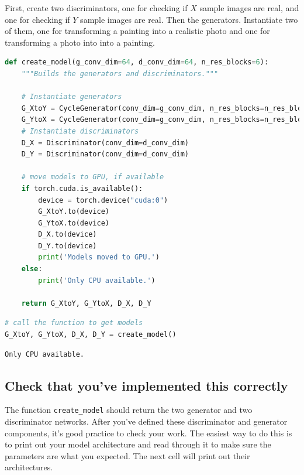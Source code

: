 First, create two discriminators, one for checking if \(X\) sample
images are real, and one for checking if \(Y\) sample images are real.
Then the generators. Instantiate two of them, one for transforming a
painting into a realistic photo and one for transforming a photo into
into a painting.

\begin{lstlisting}[language=Python]
def create_model(g_conv_dim=64, d_conv_dim=64, n_res_blocks=6):
    """Builds the generators and discriminators."""
    
    # Instantiate generators
    G_XtoY = CycleGenerator(conv_dim=g_conv_dim, n_res_blocks=n_res_blocks)
    G_YtoX = CycleGenerator(conv_dim=g_conv_dim, n_res_blocks=n_res_blocks)
    # Instantiate discriminators
    D_X = Discriminator(conv_dim=d_conv_dim)
    D_Y = Discriminator(conv_dim=d_conv_dim)

    # move models to GPU, if available
    if torch.cuda.is_available():
        device = torch.device("cuda:0")
        G_XtoY.to(device)
        G_YtoX.to(device)
        D_X.to(device)
        D_Y.to(device)
        print('Models moved to GPU.')
    else:
        print('Only CPU available.')

    return G_XtoY, G_YtoX, D_X, D_Y
\end{lstlisting}

\begin{lstlisting}[language=Python]
# call the function to get models
G_XtoY, G_YtoX, D_X, D_Y = create_model()
\end{lstlisting}

\begin{lstlisting}
Only CPU available.
\end{lstlisting}

\subsection{Check that you've implemented this correctly}

The function \lstinline{create_model} should return the
two generator and two discriminator networks. After you've defined these
discriminator and generator components, it's good practice to check your
work. The easiest way to do this is to print out your model architecture
and read through it to make sure the parameters are what you expected.
The next cell will print out their architectures.

